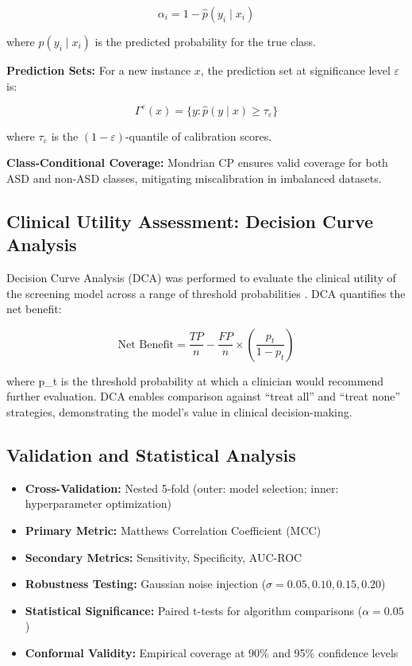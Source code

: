 \[
\alpha_i = 1 - \hat{p}(y_i \mid x_i)
\]

where \(\hat{p}(y_i \mid x_i)\) is the predicted probability for the true class.

\textbf{Prediction Sets:} For a new instance \(x\), the prediction set at significance level \(\varepsilon\) is:

\[
\Gamma^\varepsilon(x) = \{y : \hat{p}(y \mid x) \ge \tau_\varepsilon\}
\]

where \(\tau_\varepsilon\) is the \((1-\varepsilon)\)-quantile of calibration scores.

\textbf{Class-Conditional Coverage:} Mondrian CP ensures valid coverage for both ASD and non-ASD classes, mitigating miscalibration in imbalanced datasets.

\subsection{Clinical Utility Assessment: Decision Curve Analysis}\label{clinical-utility-assessment-decision-curve-analysis}

Decision Curve Analysis (DCA) was performed to evaluate the clinical utility of the screening model across a range of threshold probabilities \cite{ref57}. DCA quantifies the net benefit:

\[
\text{Net Benefit} = \frac{TP}{n} - \frac{FP}{n} \times \left(\frac{p_t}{1-p_t}\right)
\]

where p\_t is the threshold probability at which a clinician would recommend further evaluation. DCA enables comparison against ``treat all'' and ``treat none'' strategies, demonstrating the model's value in clinical decision-making.

\subsection{Validation and Statistical Analysis}\label{validation-and-statistical-analysis}

\begin{itemize}
\tightlist
\item
  \textbf{Cross-Validation:} Nested 5-fold (outer: model selection; inner: hyperparameter optimization) \cite{ref58}
\item
  \textbf{Primary Metric:} Matthews Correlation Coefficient (MCC) \cite{ref59}
\item
  \textbf{Secondary Metrics:} Sensitivity, Specificity, AUC-ROC
\item
  \textbf{Robustness Testing:} Gaussian noise injection (\(\sigma = 0.05, 0.10, 0.15, 0.20\))
\item
  \textbf{Statistical Significance:} Paired t-tests for algorithm comparisons (\(\alpha = 0.05\))
\item
  \textbf{Conformal Validity:} Empirical coverage at 90\% and 95\% confidence levels
\end{itemize}

